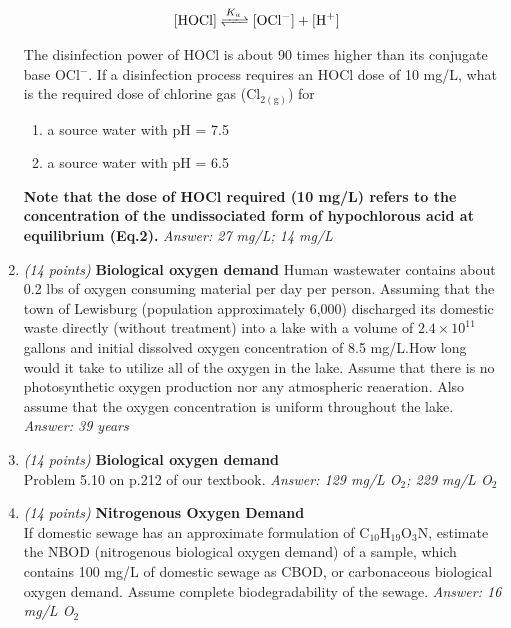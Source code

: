 \documentclass[12pt,letterpaper]{article}
\begin{document}
\begin{enumerate}
\begin{align*}
\cee{[HOCl]  &<=>[K_{a}] [OCl^-] + [H^+]}
\end{align*}

The disinfection power of HOCl is about 90 times higher than its conjugate base OCl$^-$. If a disinfection process requires an HOCl dose of 10 mg/L, what is the required dose of chlorine gas (Cl$\mathrm{_{2(g)}}$) for
\begin{enumerate}
\item a source water with pH = 7.5
\item a source water with pH = 6.5
\end{enumerate}

\textbf{Note that the dose of HOCl required (10 mg/L) refers to the concentration of the undissociated form of hypochlorous acid at equilibrium (Eq.2).} \emph{Answer: 27 mg/L; 14 mg/L}  


\item \emph{(14 points)} \textbf{Biological oxygen demand} Human wastewater contains about 0.2 lbs of oxygen consuming material per day per person.  Assuming that the town of Lewisburg (population approximately 6,000) discharged its domestic waste directly (without treatment) into a lake with a volume of $2.4\times 10^{11}$ gallons and initial dissolved oxygen concentration of 8.5 mg/L.How long would it take to utilize all of the oxygen in the lake. Assume that there is no photosynthetic oxygen production nor any atmospheric reaeration.  Also assume that the oxygen concentration is uniform throughout the lake. \emph{Answer: 39 years}

\item \emph{(14 points)} \textbf{Biological oxygen demand}\\
Problem 5.10 on p.212 of our textbook. \emph{Answer: 129 mg/L O$_2$; 229 mg/L O$_2$}

\item \emph{(14 points)} \textbf{Nitrogenous Oxygen Demand}\\ If domestic sewage has an approximate formulation of C$_{10}$H$_{19}$O$_3$N, estimate the NBOD
(nitrogenous biological oxygen demand) of a sample, which contains 100 mg/L of domestic sewage    
as CBOD, or carbonaceous biological oxygen demand. Assume complete biodegradability of the sewage. \emph{Answer: 16 mg/L O$_2$}



\end{enumerate}


  




 
\end{document}
